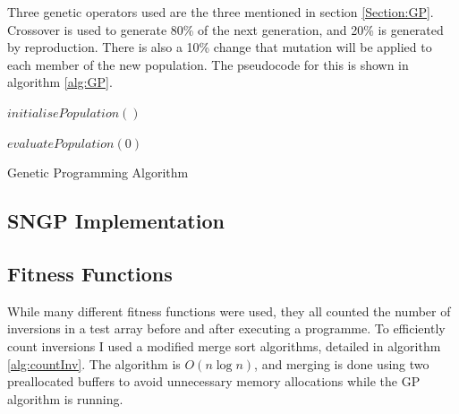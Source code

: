 \documentclass{article}
\begin{document}
		Three genetic operators used are the three mentioned in section \ref{Section:GP}. Crossover is used to generate 80\% of the next generation, and 20\% is generated by reproduction. There is also a 10\% change that mutation will be applied to each member of the new population. The pseudocode for this is shown in algorithm \ref{alg:GP}.
		
		\begin{algorithm}[H]
			
			$initialisePopulation()$
			
			$evaluatePopulation(0)$
			
		
				
			\caption{Genetic Programming Algorithm}
			
			\label{alg:GP}
		\end{algorithm}
		
		\subsection{SNGP Implementation}
		
		\subsection{Fitness Functions}
		
			While many different fitness functions were used, they all counted the number of inversions in a test array before and after executing a programme. To efficiently count inversions I used a modified merge sort algorithms, detailed in algorithm \ref{alg:countInv}. The algorithm is $O(n\log{}n)$, and merging is done using two preallocated buffers to avoid unnecessary memory allocations while the GP algorithm is running.
			
\end{document}
